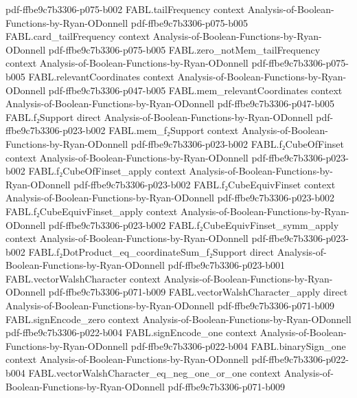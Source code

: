 \begin{theorem}
  {pdf-ffbe9c7b3306-p075-b002}
\proofstep
  {FABL.tailFrequency}
  {context}
  {Analysis-of-Boolean-Functions-by-Ryan-ODonnell}
  {pdf-ffbe9c7b3306-p075-b005}
\proofstep
  {FABL.card_tailFrequency}
  {context}
  {Analysis-of-Boolean-Functions-by-Ryan-ODonnell}
  {pdf-ffbe9c7b3306-p075-b005}
\proofstep
  {FABL.zero_notMem_tailFrequency}
  {context}
  {Analysis-of-Boolean-Functions-by-Ryan-ODonnell}
  {pdf-ffbe9c7b3306-p075-b005}
\proofstep
  {FABL.relevantCoordinates}
  {context}
  {Analysis-of-Boolean-Functions-by-Ryan-ODonnell}
  {pdf-ffbe9c7b3306-p047-b005}
\proofstep
  {FABL.mem_relevantCoordinates}
  {context}
  {Analysis-of-Boolean-Functions-by-Ryan-ODonnell}
  {pdf-ffbe9c7b3306-p047-b005}
\proofstep
  {FABL.f₂Support}
  {direct}
  {Analysis-of-Boolean-Functions-by-Ryan-ODonnell}
  {pdf-ffbe9c7b3306-p023-b002}
\proofstep
  {FABL.mem_f₂Support}
  {context}
  {Analysis-of-Boolean-Functions-by-Ryan-ODonnell}
  {pdf-ffbe9c7b3306-p023-b002}
\proofstep
  {FABL.f₂CubeOfFinset}
  {context}
  {Analysis-of-Boolean-Functions-by-Ryan-ODonnell}
  {pdf-ffbe9c7b3306-p023-b002}
\proofstep
  {FABL.f₂CubeOfFinset_apply}
  {context}
  {Analysis-of-Boolean-Functions-by-Ryan-ODonnell}
  {pdf-ffbe9c7b3306-p023-b002}
\proofstep
  {FABL.f₂CubeEquivFinset}
  {context}
  {Analysis-of-Boolean-Functions-by-Ryan-ODonnell}
  {pdf-ffbe9c7b3306-p023-b002}
\proofstep
  {FABL.f₂CubeEquivFinset_apply}
  {context}
  {Analysis-of-Boolean-Functions-by-Ryan-ODonnell}
  {pdf-ffbe9c7b3306-p023-b002}
\proofstep
  {FABL.f₂CubeEquivFinset_symm_apply}
  {context}
  {Analysis-of-Boolean-Functions-by-Ryan-ODonnell}
  {pdf-ffbe9c7b3306-p023-b002}
\proofstep
  {FABL.f₂DotProduct_eq_coordinateSum_f₂Support}
  {direct}
  {Analysis-of-Boolean-Functions-by-Ryan-ODonnell}
  {pdf-ffbe9c7b3306-p023-b001}
\proofstep
  {FABL.vectorWalshCharacter}
  {context}
  {Analysis-of-Boolean-Functions-by-Ryan-ODonnell}
  {pdf-ffbe9c7b3306-p071-b009}
\proofstep
  {FABL.vectorWalshCharacter_apply}
  {direct}
  {Analysis-of-Boolean-Functions-by-Ryan-ODonnell}
  {pdf-ffbe9c7b3306-p071-b009}
\proofstep
  {FABL.signEncode_zero}
  {context}
  {Analysis-of-Boolean-Functions-by-Ryan-ODonnell}
  {pdf-ffbe9c7b3306-p022-b004}
\proofstep
  {FABL.signEncode_one}
  {context}
  {Analysis-of-Boolean-Functions-by-Ryan-ODonnell}
  {pdf-ffbe9c7b3306-p022-b004}
\proofstep
  {FABL.binarySign_one}
  {context}
  {Analysis-of-Boolean-Functions-by-Ryan-ODonnell}
  {pdf-ffbe9c7b3306-p022-b004}
\proofstep
  {FABL.vectorWalshCharacter_eq_neg_one_or_one}
  {context}
  {Analysis-of-Boolean-Functions-by-Ryan-ODonnell}
  {pdf-ffbe9c7b3306-p071-b009}

\end{theorem}

